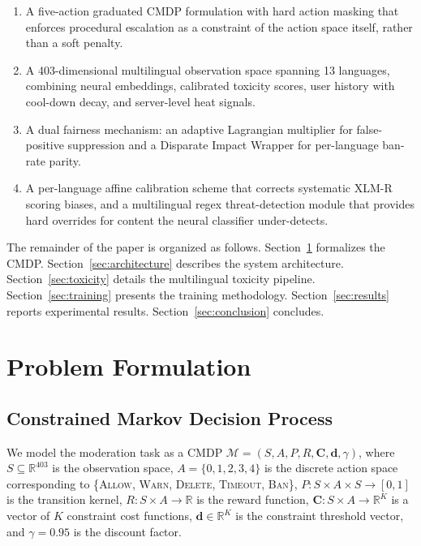 \documentclass[journal]{IEEEtran}
\begin{document}
\begin{enumerate}
  \item A five-action graduated CMDP formulation with hard action masking that enforces
        procedural escalation as a constraint of the action space itself, rather than
        a soft penalty.

  \item A 403-dimensional multilingual observation space spanning 13 languages, combining
        neural embeddings, calibrated toxicity scores, user history with cool-down decay,
        and server-level heat signals.

  \item A dual fairness mechanism: an adaptive Lagrangian multiplier for false-positive
        suppression and a Disparate Impact Wrapper for per-language ban-rate parity.

  \item A per-language affine calibration scheme that corrects systematic XLM-R scoring
        biases, and a multilingual regex threat-detection module that provides hard
        overrides for content the neural classifier under-detects.
\end{enumerate}

The remainder of the paper is organized as follows. Section~\ref{sec:formulation}
formalizes the CMDP. Section~\ref{sec:architecture} describes the system architecture.
Section~\ref{sec:toxicity} details the multilingual toxicity pipeline. Section~\ref{sec:training}
presents the training methodology. Section~\ref{sec:results} reports experimental results.
Section~\ref{sec:conclusion} concludes.


\section{Problem Formulation}
\label{sec:formulation}

\subsection{Constrained Markov Decision Process}

We model the moderation task as a CMDP $\mathcal{M} = (S, A, P, R, \mathbf{C}, \mathbf{d}, \gamma)$,
where $S \subseteq \mathbb{R}^{403}$ is the observation space, $A = \{0,1,2,3,4\}$ is
the discrete action space corresponding to \{\textsc{Allow}, \textsc{Warn}, \textsc{Delete},
\textsc{Timeout}, \textsc{Ban}\}, $P: S \times A \times S \to [0,1]$ is the transition
kernel, $R: S \times A \to \mathbb{R}$ is the reward function, $\mathbf{C}: S \times A
\to \mathbb{R}^K$ is a vector of $K$ constraint cost functions, $\mathbf{d} \in \mathbb{R}^K$
is the constraint threshold vector, and $\gamma = 0.95$ is the discount factor.
\end{document}
